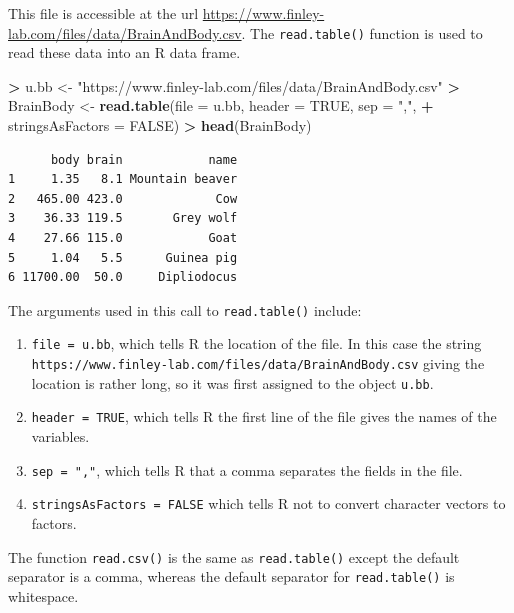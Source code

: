 \documentclass[
]{krantz}
\makeatletter
\newenvironment{Shaded}{\begin{snugshade}}{\end{snugshade}}
\newcommand{\DataTypeTok}[1]{\textcolor[rgb]{0.27,0.27,0.27}{#1}}
\newcommand{\KeywordTok}[1]{\textcolor[rgb]{0.27,0.27,0.27}{\textbf{#1}}}
\newcommand{\NormalTok}[1]{#1}
\newcommand{\OperatorTok}[1]{\textcolor[rgb]{0.43,0.43,0.43}{\textbf{#1}}}
\newcommand{\OtherTok}[1]{\textcolor[rgb]{0.37,0.37,0.37}{#1}}
\newcommand{\StringTok}[1]{\textcolor[rgb]{0.5,0.5,0.5}{#1}}
\providecommand{\tightlist}{%
  \setlength{\itemsep}{0pt}\setlength{\parskip}{0pt}}
\newenvironment{kframe}{%
\medskip{}
\setlength{\fboxsep}{.8em}
 \def\at@end@of@kframe{}%
 \ifinner\ifhmode%
  \def\at@end@of@kframe{\end{minipage}}%
  \begin{minipage}{\columnwidth}%
 \fi\fi%
 \def\FrameCommand##1{\hskip\@totalleftmargin \hskip-\fboxsep
 \colorbox{shadecolor}{##1}\hskip-\fboxsep
     \hskip-\linewidth \hskip-\@totalleftmargin \hskip\columnwidth}%
 \MakeFramed {\advance\hsize-\width
   \@totalleftmargin\z@ \linewidth\hsize
   \@setminipage}}%
 {\par\unskip\endMakeFramed%
 \at@end@of@kframe}
\renewenvironment{Shaded}{\begin{kframe}}{\end{kframe}}
\makeatother
\begin{document}
This file is accessible at the url \url{https://www.finley-lab.com/files/data/BrainAndBody.csv}. The \texttt{read.table()} function is used to read these data into an R data frame.

\begin{Shaded}
\begin{Highlighting}[]
\OperatorTok{\textgreater{}}\StringTok{ }\NormalTok{u.bb \textless{}{-}}\StringTok{ "https://www.finley{-}lab.com/files/data/BrainAndBody.csv"}
\OperatorTok{\textgreater{}}\StringTok{ }\NormalTok{BrainBody \textless{}{-}}\StringTok{ }\KeywordTok{read.table}\NormalTok{(}\DataTypeTok{file =}\NormalTok{ u.bb, }\DataTypeTok{header =} \OtherTok{TRUE}\NormalTok{, }\DataTypeTok{sep =} \StringTok{","}\NormalTok{, }
\OperatorTok{+}\StringTok{                         }\DataTypeTok{stringsAsFactors =} \OtherTok{FALSE}\NormalTok{)}
\OperatorTok{\textgreater{}}\StringTok{ }\KeywordTok{head}\NormalTok{(BrainBody)}
\end{Highlighting}
\end{Shaded}

\begin{verbatim}
      body brain            name
1     1.35   8.1 Mountain beaver
2   465.00 423.0             Cow
3    36.33 119.5       Grey wolf
4    27.66 115.0            Goat
5     1.04   5.5      Guinea pig
6 11700.00  50.0     Dipliodocus
\end{verbatim}

The arguments used in this call to \texttt{read.table()} include:

\begin{enumerate}
\def\labelenumi{\arabic{enumi}.}
\tightlist
\item
  \texttt{file\ =\ u.bb}, which tells R the location of the file. In this case the string \texttt{https://www.finley-lab.com/files/data/BrainAndBody.csv} giving the location is rather long, so it was first assigned to the object \texttt{u.bb}.
\item
  \texttt{header\ =\ TRUE}, which tells R the first line of the file gives the names of the variables.
\item
  \texttt{sep\ =\ ","}, which tells R that a comma separates the fields in the file.
\item
  \texttt{stringsAsFactors\ =\ FALSE} which tells R not to convert character vectors to factors.
\end{enumerate}

The function \texttt{read.csv()} is the same as \texttt{read.table()} except the default separator is a comma, whereas the default separator for \texttt{read.table()} is whitespace.
\end{document}
